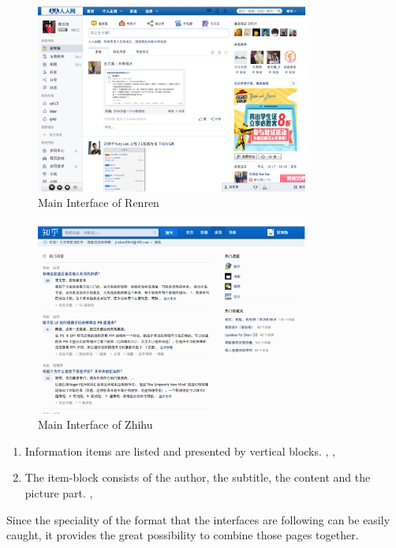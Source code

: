 \begin{enumerate}
\begin{figure}[H]
  \centering
  \includegraphics[width=0.8\textwidth]{img/renren.png}
  \caption{Main Interface of Renren\label{fig:renren}}
\end{figure}

\begin{figure}[H]
  \centering
  \includegraphics[width=0.8\textwidth]{img/zhihu.png}
  \caption{Main Interface of Zhihu\label{fig:zhihu}}
\end{figure}


\begin{enumerate}
  \item  Information items are listed and presented by vertical blocks. , , 

  \item The item-block consists of the author, the subtitle, the content and the picture part. , 
\end{enumerate}

    Since the speciality of the format
    that the interfaces are following can be easily caught,
    it provides the great possibility to combine those pages together.

\end{enumerate}

